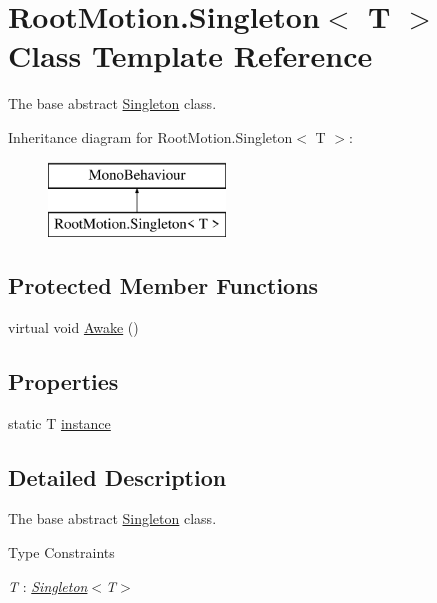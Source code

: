 \hypertarget{class_root_motion_1_1_singleton}{}\section{Root\+Motion.\+Singleton$<$ T $>$ Class Template Reference}
\label{class_root_motion_1_1_singleton}


The base abstract \mbox{\hyperlink{class_root_motion_1_1_singleton}{Singleton}} class.  


Inheritance diagram for Root\+Motion.\+Singleton$<$ T $>$\+:\begin{figure}[H]
\begin{center}
\leavevmode
\includegraphics[height=2.000000cm]{class_root_motion_1_1_singleton}
\end{center}
\end{figure}
\subsection*{Protected Member Functions}
\begin{DoxyCompactItemize}
\item 
virtual void \mbox{\hyperlink{class_root_motion_1_1_singleton_a7d30a1c590d4d36f7b137c4543389013}{Awake}} ()
\end{DoxyCompactItemize}
\subsection*{Properties}
\begin{DoxyCompactItemize}
\item 
static T \mbox{\hyperlink{class_root_motion_1_1_singleton_acfc7a495a0c8c98ce5f48e54a353c9de}{instance}}
\end{DoxyCompactItemize}


\subsection{Detailed Description}
The base abstract \mbox{\hyperlink{class_root_motion_1_1_singleton}{Singleton}} class. 

\begin{Desc}
\item[Type Constraints]\begin{description}
\item[{\em T} : {\em \mbox{\hyperlink{class_root_motion_1_1_singleton}{Singleton}}$<$T$>$}]\end{description}
\end{Desc}


